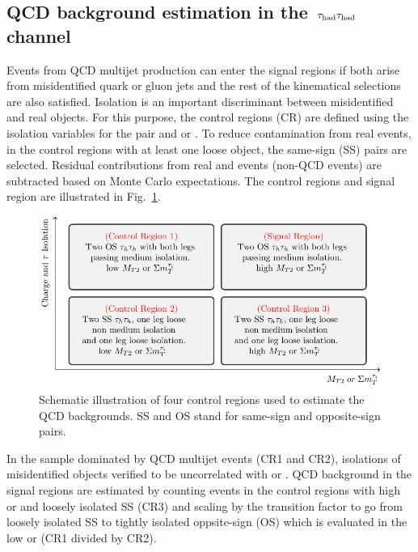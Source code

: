 \subsection{\texorpdfstring{QCD background estimation in the $\,\tau_{\rm had}\tau_{\rm had}$ channel}{QCD background estimation in the tau-tau channel}}
\label{sect:bkgQCD}
Events from QCD multijet production can enter the signal regions 
if both \Tau arise from misidentified quark or gluon jets
and the rest of the kinematical selections are also satisfied.  
Isolation is an important 
discriminant between misidentified and real \Tau objects. For this purpose, the control regions (CR) are defined using the isolation variables 
for the \Tau pair and \mttwo or \SumMT. To reduce contamination from real \tauTau events, 
in the control regions with at least one loose \Tau object, 
the same-sign (SS) pairs are selected. Residual contributions from real 
\tauTau and \wjets events (non-QCD events) are subtracted based on Monte Carlo expectations. 
The control regions and signal region are 
illustrated in Fig.~\ref{fig:ABCDQCD}. 
\begin{figure}[!htb]
\centering
\includegraphics[angle=0,scale=1.15]{Bkg/ABCD.pdf}
\caption{Schematic illustration of four control regions used to estimate the QCD backgrounds. SS and OS stand for same-sign and opposite-sign pairs.}
\label{fig:ABCDQCD}
\end{figure}
In the sample dominated by QCD multijet events (CR1 and CR2), isolations of misidentified \Tau objects verified 
to be uncorrelated with \mttwo or \SumMT.
QCD background in the signal regions are estimated by counting events in the control regions with high \mttwo or \SumMT  
and loosely isolated SS \tauTau (CR3)
and scaling by the transition factor to go from loosely isolated SS to tightly isolated oppsite-sign (OS) 
\tauTau which is evaluated in the low \mttwo or \SumMT (CR1 divided by CR2).

